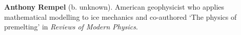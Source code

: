 \textbf{Anthony Rempel} (b. unknown). American geophysicist who applies mathematical modelling to ice mechanics and co-authored `The physics of premelting' in \emph{Reviews of Modern Physics}.


